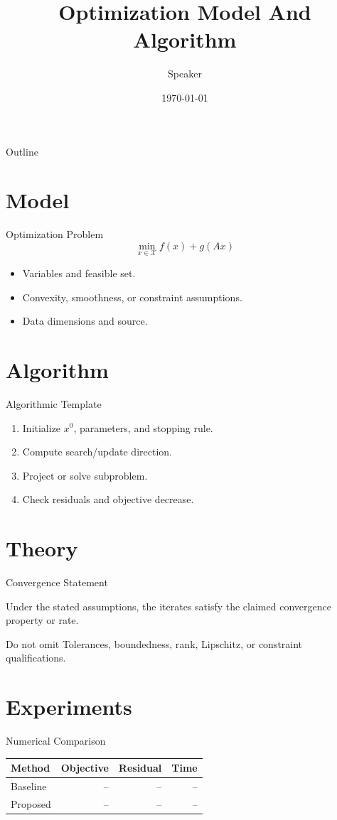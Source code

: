 \documentclass[10pt,aspectratio=169]{beamer}
\title{Optimization Model And Algorithm}
\author{Speaker}
\date{\today}
\begin{document}
\begin{frame}\titlepage\end{frame}
\begin{frame}{Outline}\tableofcontents\end{frame}

\section{Model}
\begin{frame}{Optimization Problem}
  \[
    \min_{x \in \mathcal{X}} f(x) + g(Ax)
  \]
  \begin{itemize}
    \item Variables and feasible set.
    \item Convexity, smoothness, or constraint assumptions.
    \item Data dimensions and source.
  \end{itemize}
\end{frame}

\section{Algorithm}
\begin{frame}{Algorithmic Template}
  \begin{enumerate}
    \item Initialize \(x^0\), parameters, and stopping rule.
    \item Compute search/update direction.
    \item Project or solve subproblem.
    \item Check residuals and objective decrease.
  \end{enumerate}
\end{frame}

\section{Theory}
\begin{frame}{Convergence Statement}
  \begin{theorem}
    Under the stated assumptions, the iterates satisfy the claimed convergence
    property or rate.
  \end{theorem}
  \begin{block}{Do not omit}
    Tolerances, boundedness, rank, Lipschitz, or constraint qualifications.
  \end{block}
\end{frame}

\section{Experiments}
\begin{frame}{Numerical Comparison}
  \begin{tabular}{lrrr}
    \toprule
    Method & Objective & Residual & Time \\
    \midrule
    Baseline & -- & -- & -- \\
    Proposed & -- & -- & -- \\
    \bottomrule
  \end{tabular}
\end{frame}
\end{document}
